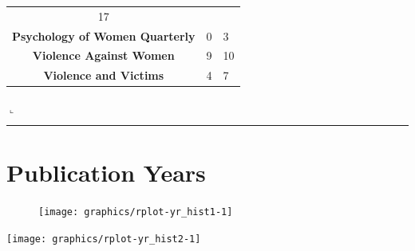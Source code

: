 \documentclass[]{tufte-handout}
\newcommand{\Reruleb}{
    \noindent
    \hspace{-1em}
    \textcolor{slgray}{
        $\llcorner$\rule[-0.4mm]{\textwidth}{0.02mm}
    }
}
\begin{document}
\begin{longtable}[]{@{}cll@{}}
\begin{minipage}[t]{0.21\columnwidth}
17\strut
\end{minipage}\tabularnewline
\begin{minipage}[t]{0.49\columnwidth}\centering\strut
\textbf{Psychology of Women Quarterly}\strut
\end{minipage} & \begin{minipage}[t]{0.21\columnwidth}\raggedright\strut
0\strut
\end{minipage} & \begin{minipage}[t]{0.21\columnwidth}\raggedright\strut
3\strut
\end{minipage}\tabularnewline
\begin{minipage}[t]{0.49\columnwidth}\centering\strut
\textbf{Violence Against Women}\strut
\end{minipage} & \begin{minipage}[t]{0.21\columnwidth}\raggedright\strut
9\strut
\end{minipage} & \begin{minipage}[t]{0.21\columnwidth}\raggedright\strut
10\strut
\end{minipage}\tabularnewline
\begin{minipage}[t]{0.49\columnwidth}\centering\strut
\textbf{Violence and Victims}\strut
\end{minipage} & \begin{minipage}[t]{0.21\columnwidth}\raggedright\strut
4\strut
\end{minipage} & \begin{minipage}[t]{0.21\columnwidth}\raggedright\strut
7\strut
\end{minipage}\tabularnewline
\bottomrule
\end{longtable}

\Reruleb

\newpage

\section{Publication Years}\label{publication-years}

\begin{figure}
\texttt{[image: graphics/rplot-yr\_hist1-1]} \end{figure}

\tufteskip

\begin{fullwidth}\begin{centering}



\texttt{[image: graphics/rplot-yr\_hist2-1]} 


\end{centering}\end{fullwidth}
\end{document}
